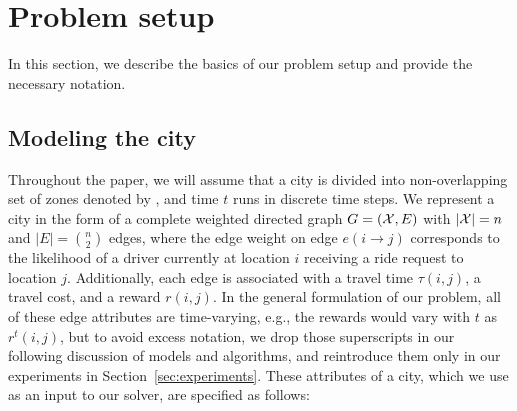 
\section{Problem setup}
\label{sec:problem_setup}

In this section, we describe the basics of our problem setup and provide the necessary notation.

\iffalse
\subsection{Notation}
\label{sec:notation}

Vectors are denoted with lowercase bold letters (e.g., $\vec{a} = [a(i)]$) and matrices are denoted with uppercase bold letters (e.g., $\matr{A} = [a(i,j)]$). The notation $\vec{1}$ refers to the vector of ones, with size dependent on the context. The short form notation $\vec{A_i}$ refers to the $i$-th row vector of the matrix $\matr{A}$. Let $\Theta_n$ be a set of $n \times n$ right-stochastic transition matrices (non-negative matrices with rows that sum to one). A probability simplex in $\mathbb{R}^n$ is denoted by $\Delta_n = \{\vec{p} \in \mathbb{R}^n_+ : \transpose{p} \vec{1} = 1 \}$.
\fi

\subsection{Modeling the city}

Throughout the paper, we will assume that a city is divided into non-overlapping set of zones denoted 
by \cityzones, and time $t$ runs in discrete time steps.
We represent a city in the form of a complete weighted directed graph $G=(\mathcal{X}, E)$ with 
$|\mathcal{X}| = n$ and $|E| = {n \choose 2}$ edges, where the edge weight on 
edge $e(i\rightarrow j)$ corresponds to the likelihood of a driver currently at 
location $i$ receiving a ride request to location $j$.  Additionally, each edge is
associated with a travel time $\tau(i, j)$, a travel cost, and a reward $r(i,j)$.
In the general formulation of our problem, all of these edge attributes are time-varying,
e.g., the rewards would vary with $t$ as $r^t(i,j)$, but to avoid excess notation, we drop
those superscripts in our following discussion of models and algorithms, and reintroduce 
them only in our experiments in Section~\ref{sec:experiments}.
 These attributes of a city, which we use as 
an input to our solver, are specified as follows:



